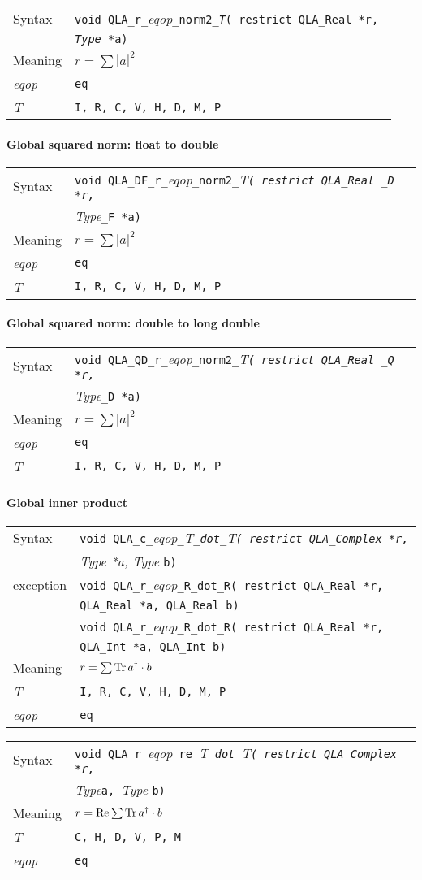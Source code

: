 \documentclass{article}
\renewcommand{\Re}{\mathop{\rm Re}}
\newcommand{\Tr}{\mathop{\rm Tr}}
\newcommand{\tReal}{QLA\ttdash Real }
\newcommand{\tInt}{QLA\ttdash Int }
\newcommand{\tqlaReal}{QLA\ttdash Real }
\newcommand{\tqlaComplex}{QLA\ttdash Complex }
\newcommand{\namespace}{QLA}
\newcommand{\allNumericTypes}{{\tt I, R, C, V, H, D, M, P}}
\newcommand{\ttdash}{{\tt \_}}
\newcommand{\itt}{\it T}
\newcommand{\extraarg}{}
\newcommand{\protoUnarySingleTypesQual}[5]{{\tt void \namespace}\ttdash{\tt #1}\ttdash{\it eqop}\ttdash#2\ttdash{\tt #3}{\tt ( restrict #4 *r, }\\
  & {\tt #5 *a\extraarg)}}
\newcommand{\globalnormsqtypeconv}{
\paragraph{Global squared norm: float to double}

\begin{flushleft}
  \begin{tabular}{|l|l|}
  \hline
  Syntax      & {\tt void \namespace}\ttdash {\tt DF}\ttdash{\tt r}\ttdash{\it eqop}\ttdash{\tt norm2}\ttdash\itt{\tt ( restrict \tqlaReal\_D *r, }\\
              & {\it Type}{\tt \_F *a\extraarg)}\\
  \hline
  Meaning     & $r = \sum |a|^2$ \\
  \hline
  {\it eqop}  & {\tt eq} \\
  \hline
  \itt        & \allNumericTypes \\
  \hline
  \end{tabular}
\end{flushleft}

\paragraph{Global squared norm: double to long double}

\begin{flushleft}
  \begin{tabular}{|l|l|}
  \hline
  Syntax      & {\tt void \namespace}\ttdash {\tt QD}\ttdash{\tt r}\ttdash{\it eqop}\ttdash{\tt norm2}\ttdash\itt{\tt ( restrict \tqlaReal\_Q *r, }\\
              & {\it Type}{\tt \_D *a\extraarg)} \\
  \hline
  Meaning     & $r = \sum |a|^2$ \\
  \hline
  {\it eqop}  & {\tt eq} \\
  \hline
  \itt        & \allNumericTypes \\
  \hline
  \end{tabular}
\end{flushleft}
}
\begin{document}
\begin{flushleft}
  \begin{tabular}{|l|l|}
  \hline
  Syntax      & \protoUnarySingleTypesQual{r}{\tt norm2}{\itt}{\tqlaReal}{{\it Type}} \\
  \hline
  Meaning     & $r = \sum |a|^2$ \\
  \hline
  {\it eqop}  & {\tt eq} \\
  \hline
  \itt        & \allNumericTypes \\
  \hline
  \end{tabular}
\end{flushleft}

\globalnormsqtypeconv

\paragraph{Global inner product}

\begin{flushleft}
  \begin{tabular}{|l|l|}
  \hline
  Syntax      & {\tt void \namespace}\ttdash{\tt c}\ttdash{\it eqop}\ttdash\itt\ttdash{\tt dot}\ttdash\itt{\tt ( restrict \tqlaComplex *r, }\\
              & {\it Type *a, }{\it Type }{\tt *b\extraarg)} \\
  exception   & {\tt void \namespace}\ttdash{\tt r}\ttdash{\it eqop}\ttdash{\tt R}\ttdash{\tt dot}\ttdash{\tt R}{\tt ( restrict \tReal *r, }\\
              & {\tt \tReal *a, }{\tt \tReal }{\tt *b\extraarg)} \\
              & {\tt void \namespace}\ttdash{\tt r}\ttdash{\it eqop}\ttdash{\tt R}\ttdash{\tt dot}\ttdash{\tt R}{\tt ( restrict \tReal *r, }\\
              & {\tt \tInt *a, }{\tt \tInt }{\tt *b\extraarg)} \\
  \hline
  Meaning     & $r = \sum \Tr a^\dagger \cdot b$ \\
  \hline
  \itt        & {\tt \allNumericTypes} \\
  \hline
  {\it eqop}  & {\tt eq} \\
  \hline
  \end{tabular}
\end{flushleft}


\begin{flushleft}
  \begin{tabular}{|l|l|}
  \hline
  Syntax      & {\tt void \namespace}\ttdash{\tt r}\ttdash{\it eqop}\ttdash{\tt re}\ttdash\itt\ttdash{\tt dot}\ttdash\itt{\tt ( restrict \tqlaComplex *r, }\\
              & {\it Type}{\tt *a, }{\it Type }{\tt *b\extraarg)} \\
  \hline
  Meaning     & $r = \Re \sum \Tr a^\dagger \cdot b$ \\
  \hline
  \itt        & {\tt C, H, D, V, P, M} \\
  \hline
  {\it eqop}  & {\tt eq} \\
  \hline
  \end{tabular}
\end{flushleft}
\end{document}
